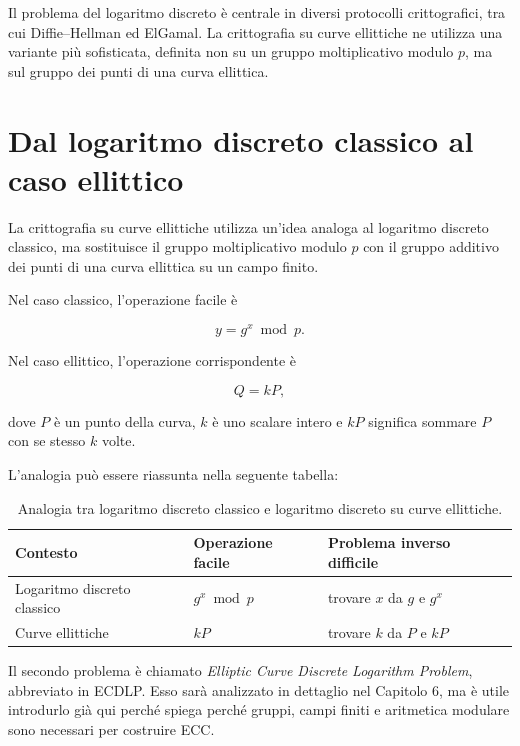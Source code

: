 \documentclass[12pt,a4paper,oneside]{report}
\begin{document}
Il problema del logaritmo discreto è centrale in diversi protocolli crittografici, tra cui Diffie--Hellman ed ElGamal. La crittografia su curve ellittiche ne utilizza una variante più sofisticata, definita non su un gruppo moltiplicativo modulo \(p\), ma sul gruppo dei punti di una curva ellittica.

\section{Dal logaritmo discreto classico al caso ellittico}

La crittografia su curve ellittiche utilizza un'idea analoga al logaritmo discreto classico, ma sostituisce il gruppo moltiplicativo modulo \(p\) con il gruppo additivo dei punti di una curva ellittica su un campo finito.

Nel caso classico, l'operazione facile è

\begin{equation}
    y = g^x \bmod p.
\end{equation}

Nel caso ellittico, l'operazione corrispondente è

\begin{equation}
    Q = kP,
\end{equation}

dove \(P\) è un punto della curva, \(k\) è uno scalare intero e \(kP\) significa sommare \(P\) con se stesso \(k\) volte.

L'analogia può essere riassunta nella seguente tabella:

\begin{table}[h]
\centering
\begin{tabular}{lll}
\toprule
\textbf{Contesto} & \textbf{Operazione facile} & \textbf{Problema inverso difficile} \\
\midrule
Logaritmo discreto classico & \(g^x \bmod p\) & trovare \(x\) da \(g\) e \(g^x\) \\
Curve ellittiche & \(kP\) & trovare \(k\) da \(P\) e \(kP\) \\
\bottomrule
\end{tabular}
\caption{Analogia tra logaritmo discreto classico e logaritmo discreto su curve ellittiche.}
\label{tab:dlp-ecdlp}
\end{table}

Il secondo problema è chiamato \textit{Elliptic Curve Discrete Logarithm Problem}, abbreviato in ECDLP. Esso sarà analizzato in dettaglio nel Capitolo 6, ma è utile introdurlo già qui perché spiega perché gruppi, campi finiti e aritmetica modulare sono necessari per costruire ECC.
\end{document}
